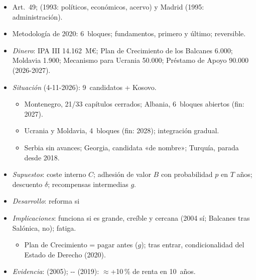 \documentclass{article}
\begin{document}
\begin{columnas}
\begin{itemize}
\item Art.~49;  (1993: políticos, económicos, acervo) y Madrid (1995: administración).
\item Metodología de 2020: 6~bloques; fundamentos, primero y último; reversible.
\item \emph{Dinero}: IPA III 14.162~M€; Plan de Crecimiento de los Balcanes 6.000; Moldavia 1.900; Mecanismo para Ucrania 50.000; Préstamo de Apoyo 90.000 (2026-2027).
\item \emph{Situación} (4-11-2026): 9~candidatos + Kosovo.
  \begin{itemize}
  \item Montenegro, 21/33 capítulos cerrados; Albania, 6~bloques abiertos (fin: 2027).
  \item Ucrania y Moldavia, 4~bloques (fin: 2028); integración gradual.
  \item Serbia sin avances; Georgia, candidata «de nombre»; Turquía, parada desde 2018.
  \end{itemize}
\end{itemize}
\begin{itemize}
\item \emph{Supuestos}: coste interno $C$; adhesión de valor $B$ con probabilidad $p$ en $T$ años; descuento $\delta$; recompensas intermedias $g$.
\item \emph{Desarrollo}: reforma si
\item \emph{Implicaciones}: funciona si es grande, creíble y cercana (2004 sí; Balcanes tras Salónica, no); fatiga.
  \begin{itemize}
  \item Plan de Crecimiento = pagar antes ($g$); tras entrar, condicionalidad del Estado de Derecho (2020).
  \end{itemize}
\item \emph{Evidencia}:  (2005); -- (2019): $\approx$+10\,\% de renta en 10~años.
\end{itemize}

\end{columnas}
\end{document}
